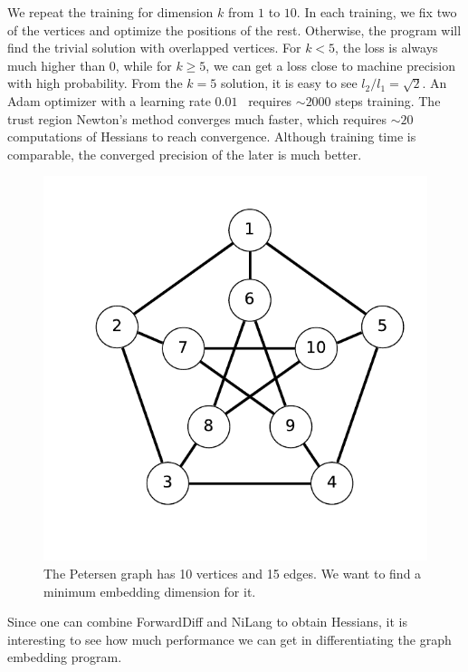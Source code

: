 \documentclass{article}
\newcommand{\<}{\langle}
\renewcommand{\>}{\rangle}
\renewcommand{\cite}[1]{{\citep{#1}}}
\theoremstyle{definition}\newtheorem{definition}{\textit{Definition}}
\begin{document}
We repeat the training for dimension $k$ from $1$ to $10$.
In each training, we fix two of the vertices and optimize the positions of the rest. Otherwise, the program will find the trivial solution with overlapped vertices. 
For $k < 5$, the loss is always much higher than $0$,
while for $k\geq5$, we can get a loss close to machine precision with high probability.
From the $k=5$ solution, it is easy to see $l_2/l_1 = \sqrt{2}$.
An Adam optimizer with a learning rate $0.01$~\cite{Kingma2014} requires $\sim2000$ steps training.
The trust region Newton's method converges much faster, which requires $\sim 20$ computations of Hessians to reach convergence.
Although training time is comparable, the converged precision of the later is much better.
\begin{figure}
    \centerline{\includegraphics[width=0.4\columnwidth,trim={0 1cm 0 0},clip]{petersen.pdf}}
    \caption{The Petersen graph has 10 vertices and 15 edges. We want to find a minimum embedding dimension for it.}\label{fig:petersen}
\end{figure}

Since one can combine ForwardDiff and NiLang to obtain Hessians,
it is interesting to see how much performance we can get in differentiating the graph embedding program.
\end{document}
